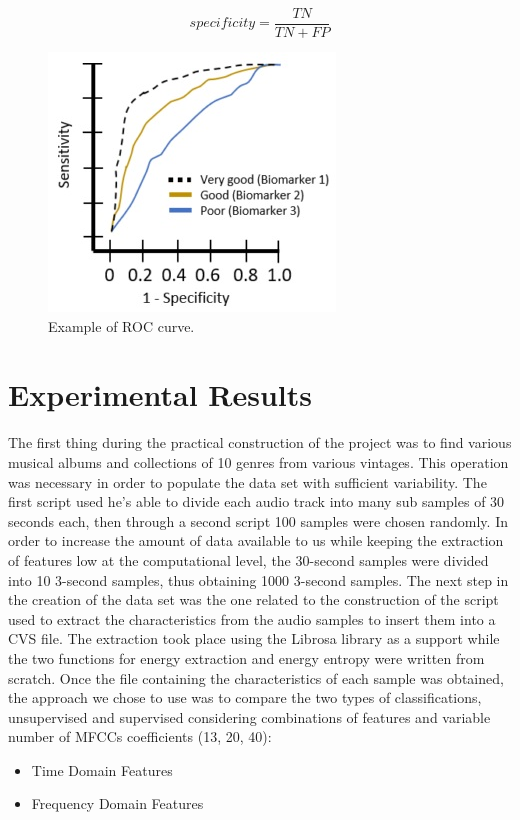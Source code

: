 \documentclass[conference]{IEEEtran}
\begin{document}
\begin{itemize}
\begin{equation}
        specificity=\frac{TN}{TN+FP}    
    \end{equation}
    \begin{figure}[!ht]
    \centering
    \includegraphics[width=0.7\linewidth]{Image/ROC_V2.jpg}
    \caption{\label{fig:ROC}Example of ROC curve.}
\end{figure}
\end{itemize}

\section{Experimental Results}
\noindent
The first thing during the practical construction of the project was to find various musical albums and collections of 10 genres from various vintages. This operation was necessary in order to populate the data set with sufficient variability. The first script used he's able to divide each audio track into many sub samples of 30 seconds each, then through a second script 100 samples were chosen randomly. In order to increase the amount of data available to us while keeping the extraction of features low at the computational level, the 30-second samples were divided into 10 3-second samples, thus obtaining 1000 3-second samples. The next step in the creation of the data set was the one related to the construction of the script used to extract the characteristics from the audio samples to insert them into a CVS file. The extraction took place using the Librosa library as a support while the two functions for energy extraction and energy entropy were written from scratch. Once the file containing the characteristics of each sample was obtained, the approach we chose to use was to compare the two types of classifications, unsupervised and supervised considering combinations of features and variable number of MFCCs coefficients (13, 20, 40):
\vspace{2mm} %
\begin{itemize}
    \item Time Domain Features
    \item Frequency Domain Features
\end{itemize}
\vspace{2mm} %
\end{document}
